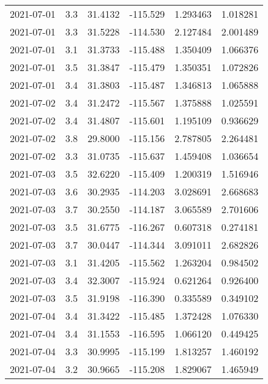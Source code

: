 \begin{tabular}{lrrrrr}
2021-07-01 &       3.3 &  31.4132 &  -115.529 &         1.293463 &         1.018281 \\
2021-07-01 &       3.3 &  31.5228 &  -114.530 &         2.127484 &         2.001489 \\
2021-07-01 &       3.1 &  31.3733 &  -115.488 &         1.350409 &         1.066376 \\
2021-07-01 &       3.5 &  31.3847 &  -115.479 &         1.350351 &         1.072826 \\
2021-07-01 &       3.4 &  31.3803 &  -115.487 &         1.346813 &         1.065888 \\
2021-07-02 &       3.4 &  31.2472 &  -115.567 &         1.375888 &         1.025591 \\
2021-07-02 &       3.4 &  31.4807 &  -115.601 &         1.195109 &         0.936629 \\
2021-07-02 &       3.8 &  29.8000 &  -115.156 &         2.787805 &         2.264481 \\
2021-07-02 &       3.3 &  31.0735 &  -115.637 &         1.459408 &         1.036654 \\
2021-07-03 &       3.5 &  32.6220 &  -115.409 &         1.200319 &         1.516946 \\
2021-07-03 &       3.6 &  30.2935 &  -114.203 &         3.028691 &         2.668683 \\
2021-07-03 &       3.7 &  30.2550 &  -114.187 &         3.065589 &         2.701606 \\
2021-07-03 &       3.5 &  31.6775 &  -116.267 &         0.607318 &         0.274181 \\
2021-07-03 &       3.7 &  30.0447 &  -114.344 &         3.091011 &         2.682826 \\
2021-07-03 &       3.1 &  31.4205 &  -115.562 &         1.263204 &         0.984502 \\
2021-07-03 &       3.4 &  32.3007 &  -115.924 &         0.621264 &         0.926400 \\
2021-07-03 &       3.5 &  31.9198 &  -116.390 &         0.335589 &         0.349102 \\
2021-07-04 &       3.4 &  31.3422 &  -115.485 &         1.372428 &         1.076330 \\
2021-07-04 &       3.4 &  31.1553 &  -116.595 &         1.066120 &         0.449425 \\
2021-07-04 &       3.3 &  30.9995 &  -115.199 &         1.813257 &         1.460192 \\
2021-07-04 &       3.2 &  30.9665 &  -115.208 &         1.829067 &         1.465949 \\

\end{tabular}
